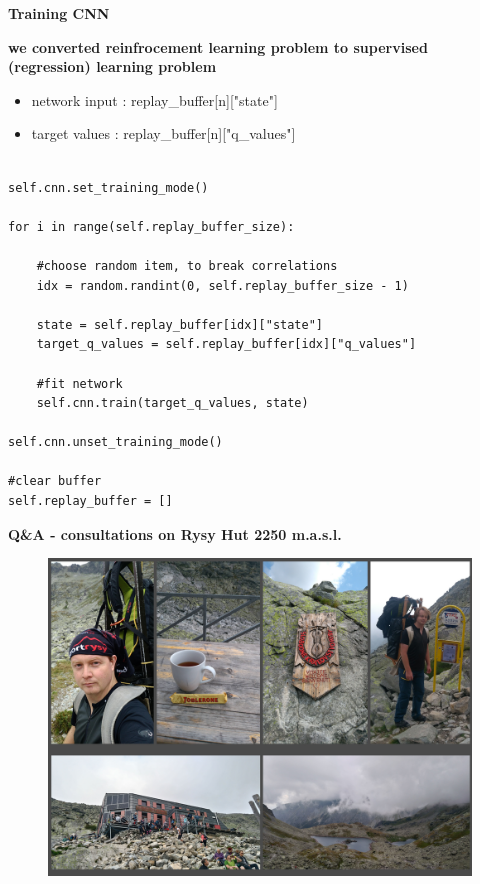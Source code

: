 \documentclass[xcolor=dvipsnames]{beamer}
\begin{document}
\begin{frame}[fragile]
{\bf Training CNN}

{\bf we converted reinfrocement learning problem to supervised (regression) learning problem}

\begin{itemize}
    \item network input : replay\_buffer[n]["state"]
    \item target values : replay\_buffer[n]["q\_values"]
\end{itemize}


\begin{lstlisting}

self.cnn.set_training_mode()

for i in range(self.replay_buffer_size):

    #choose random item, to break correlations
    idx = random.randint(0, self.replay_buffer_size - 1)

    state = self.replay_buffer[idx]["state"]
    target_q_values = self.replay_buffer[idx]["q_values"]

    #fit network
    self.cnn.train(target_q_values, state)

self.cnn.unset_training_mode()

#clear buffer
self.replay_buffer = []

\end{lstlisting}

\end{frame}




\begin{frame}{\bf Q\&A - consultations on Rysy Hut 2250 m.a.s.l.}
 \vspace{-6mm}
\begin{figure}
  \includegraphics[scale=0.5]{./pictures/me_rysy.jpg}
\end{figure}

\end{frame}
\end{document}
